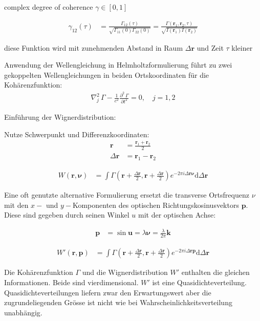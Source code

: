 \documentclass{article}
\newcommand{\vect}[1]{\mathbf{#1}}
\renewcommand{\r}{\vect r}
\newcommand{\p}{\vect p}
\renewcommand{\k}{\vect k}
\newcommand{\vnu}{\boldsymbol\nu}
\begin{document}
complex degree of coherence $\gamma\in[0,1]$

\begin{align}
  \gamma_{12}(\tau) &= \frac{\Gamma_{12}(\tau)}{\sqrt{\Gamma_{11}(0)\Gamma_{22}(0)}} = \frac{\Gamma(\r_1,\r_2,\tau)}{\sqrt{I(\r_1)I(\r_2)}}
\end{align}

diese Funktion wird mit zunehmenden Abstand in Raum $\Delta\r$ und Zeit $\tau$ kleiner

Anwendung der Wellengleichung in Helmholtzformulierung f\"uhrt zu zwei
gekoppelten Wellengleichungen in beiden Ortskoordinaten f\"ur die
Koh\"arenzfunktion:
\begin{align}
  \nabla_j^2\,\Gamma - \frac{1}{c^2} \frac{\partial^2\, \Gamma}{\partial t^2} = 0, \quad j=1,2
\end{align}

Einf\"uhrung der Wignerdistribution:

Nutze Schwerpunkt und Differenzkoordinaten:
\begin{align}
  \r &= \frac{\r_1+\r_2}{2} \\
  \Delta\r &= \r_1-\r_2
\end{align}


\begin{align}
  W(\r,\vnu) &= \int\Gamma\left(\r+\frac{\Delta\r}{2},\r+\frac{\Delta\r}{2}\right) e^{-2\pi i \Delta\r\vnu}\textrm{d}\Delta\r
\end{align}

Eine oft genutzte alternative Formulierung ersetzt die transverse
Ortsfrequenz $\nu$ mit den $x-$ und $y-$Komponenten des optischen
Richtungskosinusvektors $\p$. Diese sind gegeben durch seinen Winkel
$u$ mit der optischen Achse:

\begin{align}
  \p &= \sin\vect u = \lambda \vnu = \frac{\lambda}{2\pi} \k
\end{align}

\begin{align}
  W'(\r,\p) &= \int\Gamma\left(\r+\frac{\Delta\r}{2},\r+\frac{\Delta\r}{2}\right) e^{-2\pi i \Delta\r\p}\textrm{d}\Delta\r
\end{align}


Die Koh\"arenzfunktion $\Gamma$ und die Wignerdistribution $W'$
enthalten die gleichen Informationen. Beide sind vierdimensional. $W'$
ist eine Quasidichteverteilung. Quasidichteverteilungen liefern zwar
den Erwartungswert aber die zugrundeliegenden Gr\"osse ist nicht wie
bei Wahrscheinlichkeitsverteilung unabh\"angig.
\end{document}

